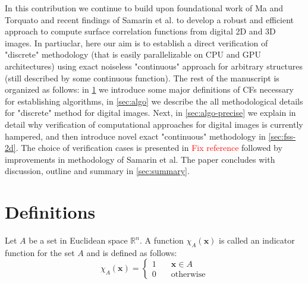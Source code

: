 \documentclass[reprint,amsmath,amssymb,aps,pre,showkeys,showpacs]{revtex4-1}
\begin{document}
In this contribution we continue to build upon foundational work of Ma and
Torquato \cite{ma2018SS} and recent findings of Samarin et al. \cite{our_SS} to
develop a robust and efficient approach to compute surface correlation functions
from digital 2D and 3D images. In partiuclar, here our aim is to establish a
direct verification of "discrete" methodology (that is easily parallelizable on
CPU and GPU architectures) using exact noiseless "continuous" approach for
arbitrary structures (still described by some continuous function). The rest of
the manuscript is organized as follows: in \cref{sec:def} we introduce some
major definitions of CFs necessary for establishing algorithms, in
\cref{sec:algo} we describe the all methodological details for "discrete" method
for digital images. Next, in \cref{sec:algo-precise} we explain in detail why
verification of computational approaches for digital images is currently
hampered, and then introduce novel exact "continuous" methodology in
\cref{sec:fss-2d}. The choice of verification cases is presented in
\textcolor{red}{Fix reference} followed by improvements in methodology of
Samarin et al. The paper concludes with discussion, outline and summary in
\cref{sec:summary}.

\section{Definitions}
\label{sec:def}
Let $A$ be a set in Euclidean space $\mathbb{R}^n$. A function
$\chi_A(\mathbf{x})$ is called an indicator function for the set $A$ and is
defined as follows:
\begin{equation*}
  \chi_A(\bm{x}) = \left\{
  \begin{array}{ll}
    1 & \quad \bm{x} \in A \\
    0 & \quad \text{otherwise}
  \end{array}
  \right.
\end{equation*}
\end{document}
